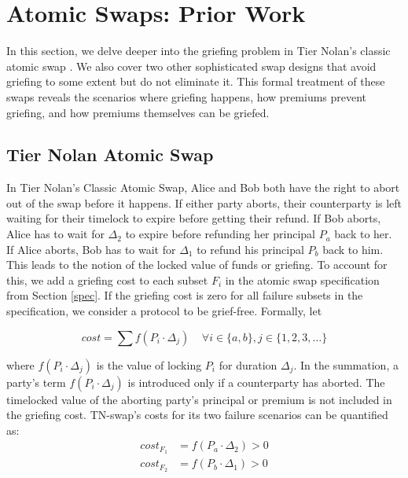 \section{Atomic Swaps: Prior Work}
In this section, we delve deeper into the griefing problem in Tier Nolan's classic atomic swap \cite{atomic_swap}. We also cover two other sophisticated swap designs that avoid griefing to some extent but do not eliminate it. This formal treatment of these swaps reveals the scenarios where griefing happens, how premiums prevent griefing, and how premiums themselves can be griefed.

\subsection{Tier Nolan Atomic Swap}\label{sec:tn_swap}
\noindent
In Tier Nolan's Classic Atomic Swap, Alice and Bob both have the right to abort out of the swap before it happens. If either party aborts, their counterparty is left waiting for their timelock to expire before getting their refund. If Bob aborts, Alice has to wait for $\Delta_2$ to expire before refunding her principal $P_a$ back to her. If Alice aborts, Bob has to wait for $\Delta_1$ to refund his principal $P_b$ back to him. This leads to the notion of the locked value of funds or griefing. To account for this, we add a griefing cost to each subset $F_i$ in the atomic swap specification from Section \ref{spec}. If the griefing cost is zero for all failure subsets in the specification, we consider a protocol to be grief-free. Formally, let

\begin{equation} \label{eq:cost}
 cost = \sum{f(P_i\cdot \Delta_j)} \;\;\;\; \forall i \in \{a, b\}, j \in \{1, 2, 3, \ldots\}
\end{equation}

where $f(P_i\cdot \Delta_j)$ is the value of locking $P_i$ for duration $\Delta_j$. In the summation, a party's term $f(P_i\cdot \Delta_j)$ is introduced only if a counterparty has aborted. The timelocked value of the aborting party's principal or premium is not included in the griefing cost. TN-swap's costs for its two failure scenarios can be quantified as:
\begin{equation}\label{eq:tr_cost}
\begin{split}
    cost_{F_1} &= f(P_a\cdot \Delta_2) > 0\\
    cost_{F_2} &= f(P_b\cdot \Delta_1) > 0\\
\end{split}
\end{equation}

